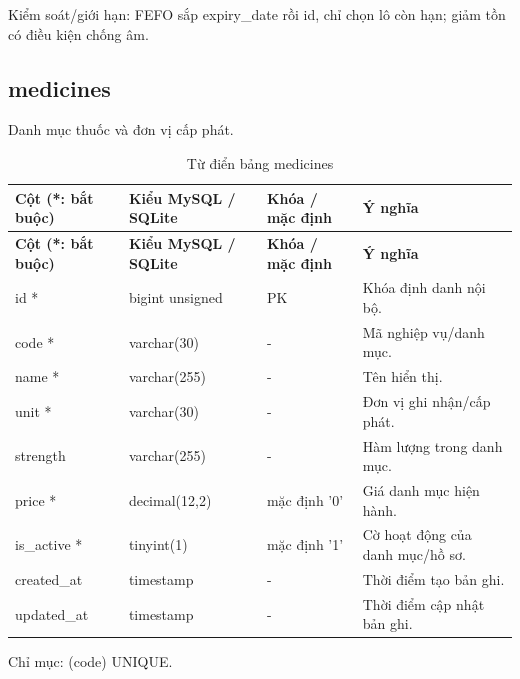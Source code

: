 Kiểm soát/\allowbreak{}giới hạn:\allowbreak{} FEFO sắp expiry\_\allowbreak{}date rồi id, chỉ chọn lô còn hạn; giảm tồn có điều kiện chống âm.\allowbreak{}

\clearpage

\subsection{medicines}
Danh mục thuốc và đơn vị cấp phát.\allowbreak{}


{\fontsize{10}{12}\selectfont\setlength{\tabcolsep}{3pt}\renewcommand{\arraystretch}{1.12}
\begin{longtable}{@{}L{\textwidth-4.86pt\relax} L{\textwidth-3.96pt\relax} L{\textwidth-2.88pt\relax} L{\textwidth-6.3pt\relax}@{}}
\caption{Từ điển bảng medicines}\\
\toprule
\textbf{Cột (*:\allowbreak{} bắt buộc)} & \textbf{Kiểu My\allowbreak{}SQL /\allowbreak{} SQLite} & \textbf{Khóa /\allowbreak{} mặc định} & \textbf{Ý nghĩa}\\\midrule
\endfirsthead
\toprule
\textbf{Cột (*:\allowbreak{} bắt buộc)} & \textbf{Kiểu My\allowbreak{}SQL /\allowbreak{} SQLite} & \textbf{Khóa /\allowbreak{} mặc định} & \textbf{Ý nghĩa}\\\midrule
\endhead
\bottomrule\endlastfoot
id * & bigint unsigned & PK & Khóa định danh nội bộ.\allowbreak{}\\[1pt]
code * & varchar(30) & - & Mã nghiệp vụ/\allowbreak{}danh mục.\allowbreak{}\\[1pt]
name * & varchar(255) & - & Tên hiển thị.\allowbreak{}\\[1pt]
unit * & varchar(30) & - & Đơn vị ghi nhận/\allowbreak{}cấp phát.\allowbreak{}\\[1pt]
strength & varchar(255) & - & Hàm lượng trong danh mục.\allowbreak{}\\[1pt]
price * & decimal(12,2) & mặc định '0' & Giá danh mục hiện hành.\allowbreak{}\\[1pt]
is\_\allowbreak{}active * & tinyint(1) & mặc định '1' & Cờ hoạt động của danh mục/\allowbreak{}hồ sơ.\allowbreak{}\\[1pt]
created\_\allowbreak{}at & timestamp & - & Thời điểm tạo bản ghi.\allowbreak{}\\[1pt]
updated\_\allowbreak{}at & timestamp & - & Thời điểm cập nhật bản ghi.\allowbreak{}\\[1pt]
\end{longtable}}
Chỉ mục:\allowbreak{} (code) UNIQUE.\allowbreak{}


